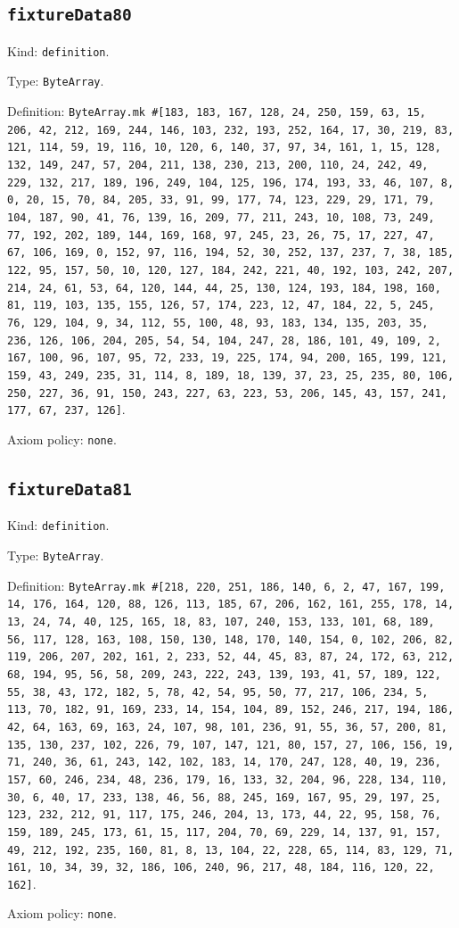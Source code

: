 \documentclass[11pt]{article}
\begin{document}
\subsection*{\texttt{fixtureData80}}
\noindent Kind: \texttt{definition}.\par
\noindent Type: \texttt{ByteArray}.\par
\noindent Definition: \texttt{ByteArray.mk \#[183, 183, 167, 128, 24, 250, 159, 63, 15, 206, 42, 212, 169, 244, 146, 103, 232, 193, 252, 164, 17, 30, 219, 83, 121, 114, 59, 19, 116, 10, 120, 6, 140, 37, 97, 34, 161, 1, 15, 128, 132, 149, 247, 57, 204, 211, 138, 230, 213, 200, 110, 24, 242, 49, 229, 132, 217, 189, 196, 249, 104, 125, 196, 174, 193, 33, 46, 107, 8, 0, 20, 15, 70, 84, 205, 33, 91, 99, 177, 74, 123, 229, 29, 171, 79, 104, 187, 90, 41, 76, 139, 16, 209, 77, 211, 243, 10, 108, 73, 249, 77, 192, 202, 189, 144, 169, 168, 97, 245, 23, 26, 75, 17, 227, 47, 67, 106, 169, 0, 152, 97, 116, 194, 52, 30, 252, 137, 237, 7, 38, 185, 122, 95, 157, 50, 10, 120, 127, 184, 242, 221, 40, 192, 103, 242, 207, 214, 24, 61, 53, 64, 120, 144, 44, 25, 130, 124, 193, 184, 198, 160, 81, 119, 103, 135, 155, 126, 57, 174, 223, 12, 47, 184, 22, 5, 245, 76, 129, 104, 9, 34, 112, 55, 100, 48, 93, 183, 134, 135, 203, 35, 236, 126, 106, 204, 205, 54, 54, 104, 247, 28, 186, 101, 49, 109, 2, 167, 100, 96, 107, 95, 72, 233, 19, 225, 174, 94, 200, 165, 199, 121, 159, 43, 249, 235, 31, 114, 8, 189, 18, 139, 37, 23, 25, 235, 80, 106, 250, 227, 36, 91, 150, 243, 227, 63, 223, 53, 206, 145, 43, 157, 241, 177, 67, 237, 126]}.\par
\noindent Axiom policy: \texttt{none}.\par
\subsection*{\texttt{fixtureData81}}
\noindent Kind: \texttt{definition}.\par
\noindent Type: \texttt{ByteArray}.\par
\noindent Definition: \texttt{ByteArray.mk \#[218, 220, 251, 186, 140, 6, 2, 47, 167, 199, 14, 176, 164, 120, 88, 126, 113, 185, 67, 206, 162, 161, 255, 178, 14, 13, 24, 74, 40, 125, 165, 18, 83, 107, 240, 153, 133, 101, 68, 189, 56, 117, 128, 163, 108, 150, 130, 148, 170, 140, 154, 0, 102, 206, 82, 119, 206, 207, 202, 161, 2, 233, 52, 44, 45, 83, 87, 24, 172, 63, 212, 68, 194, 95, 56, 58, 209, 243, 222, 243, 139, 193, 41, 57, 189, 122, 55, 38, 43, 172, 182, 5, 78, 42, 54, 95, 50, 77, 217, 106, 234, 5, 113, 70, 182, 91, 169, 233, 14, 154, 104, 89, 152, 246, 217, 194, 186, 42, 64, 163, 69, 163, 24, 107, 98, 101, 236, 91, 55, 36, 57, 200, 81, 135, 130, 237, 102, 226, 79, 107, 147, 121, 80, 157, 27, 106, 156, 19, 71, 240, 36, 61, 243, 142, 102, 183, 14, 170, 247, 128, 40, 19, 236, 157, 60, 246, 234, 48, 236, 179, 16, 133, 32, 204, 96, 228, 134, 110, 30, 6, 40, 17, 233, 138, 46, 56, 88, 245, 169, 167, 95, 29, 197, 25, 123, 232, 212, 91, 117, 175, 246, 204, 13, 173, 44, 22, 95, 158, 76, 159, 189, 245, 173, 61, 15, 117, 204, 70, 69, 229, 14, 137, 91, 157, 49, 212, 192, 235, 160, 81, 8, 13, 104, 22, 228, 65, 114, 83, 129, 71, 161, 10, 34, 39, 32, 186, 106, 240, 96, 217, 48, 184, 116, 120, 22, 162]}.\par
\noindent Axiom policy: \texttt{none}.\par
\end{document}
